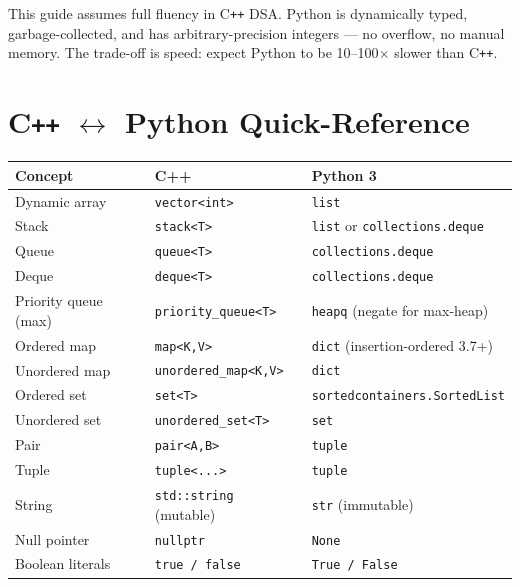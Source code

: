 \documentclass[11pt,a4paper]{report}
\begin{document}
This guide assumes full fluency in C\texttt{++} DSA\@. Python is dynamically typed,
garbage-collected, and has arbitrary-precision integers --- no overflow, no manual memory.
The trade-off is speed: expect Python to be 10--100$\times$ slower than C\texttt{++}.

\section{C\texttt{++} $\leftrightarrow$ Python Quick-Reference}

\begin{longtable}{@{}lll@{}}
\toprule
\textbf{Concept} & \textbf{C++} & \textbf{Python 3} \\
\midrule
\endhead
Dynamic array       & \texttt{vector<int>}             & \texttt{list} \\
Stack               & \texttt{stack<T>}                & \texttt{list} or \texttt{collections.deque} \\
Queue               & \texttt{queue<T>}                & \texttt{collections.deque} \\
Deque               & \texttt{deque<T>}                & \texttt{collections.deque} \\
Priority queue (max)& \texttt{priority\_queue<T>}      & \texttt{heapq} (negate for max-heap) \\
Ordered map         & \texttt{map<K,V>}                & \texttt{dict} (insertion-ordered 3.7+) \\
Unordered map       & \texttt{unordered\_map<K,V>}     & \texttt{dict} \\
Ordered set         & \texttt{set<T>}                  & \texttt{sortedcontainers.SortedList} \\
Unordered set       & \texttt{unordered\_set<T>}       & \texttt{set} \\
Pair                & \texttt{pair<A,B>}               & \texttt{tuple} \\
Tuple               & \texttt{tuple<...>}              & \texttt{tuple} \\
String              & \texttt{std::string} (mutable)   & \texttt{str} (immutable) \\
Null pointer        & \texttt{nullptr}                 & \texttt{None} \\
Boolean literals    & \texttt{true / false}            & \texttt{True / False} \\

\end{longtable}
\end{document}
